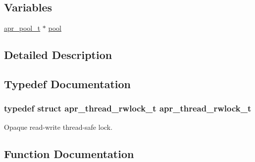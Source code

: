 \subsection*{Variables}
\begin{DoxyCompactItemize}
\item 
\hyperlink{structapr__pool__t}{apr\+\_\+pool\+\_\+t} $\ast$ \hyperlink{group__apr__thread__rwlock_ga35230907c170df5d4d7f0ca99274c574}{pool}
\end{DoxyCompactItemize}


\subsection{Detailed Description}


\subsection{Typedef Documentation}
\subsubsection[{\texorpdfstring{apr\+\_\+thread\+\_\+rwlock\+\_\+t}{apr_thread_rwlock_t}}]{\setlength{\rightskip}{0pt plus 5cm}typedef struct {\bf apr\+\_\+thread\+\_\+rwlock\+\_\+t} {\bf apr\+\_\+thread\+\_\+rwlock\+\_\+t}}\hypertarget{group__apr__thread__rwlock_gaede9b908e3d9e6a8aed7bd10d0ae0498}{}\label{group__apr__thread__rwlock_gaede9b908e3d9e6a8aed7bd10d0ae0498}
Opaque read-\/write thread-\/safe lock. 

\subsection{Function Documentation}
